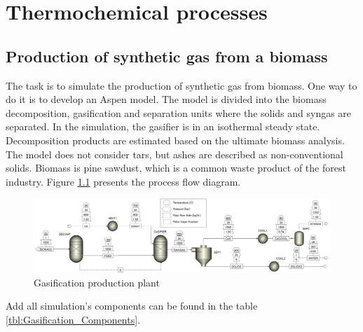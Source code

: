 \chapter{Thermochemical processes}

\section{Production of synthetic gas from a biomass}

The task is to simulate the production of synthetic gas from biomass. One way to do it is to develop an Aspen model. The model is divided into the biomass decomposition, gasification and separation units where the solids and syngas are separated. In the simulation, the gasifier is in an isothermal steady state. Decomposition products are estimated based on the ultimate biomass analysis. The model does not consider tars, but ashes are described as non-conventional solids. Biomass is pine sawdust, which is a common waste product of the forest industry. Figure \ref{fig:Gasification} presents the process flow diagram.

\begin{figure}[h!]
	\centering
	\includegraphics[width=\linewidth]{Figures/TchermochemicalProcesses/Gasification.jpeg}
	\caption{Gasification production plant}
	\label{fig:Gasification}
\end{figure}

Add all simulation's components can be found in the table \ref{tbl:Gasification_Components}.

